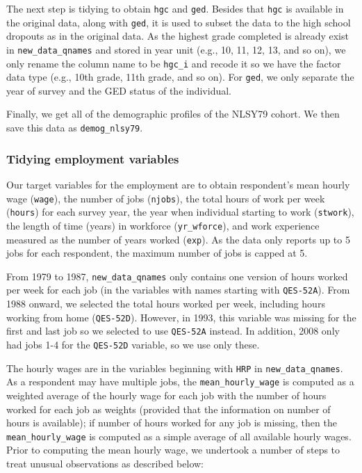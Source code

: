 \documentclass{article}
\begin{document}
The next step is tidying to obtain \texttt{hgc} and \texttt{ged}. Besides that \texttt{hgc} is available in the original data, along with \texttt{ged}, it is used to subset the data to the high school dropouts as in the original data. As the highest grade completed is already exist in \texttt{new\_data\_qnames} and stored in year unit (e.g., 10, 11, 12, 13, and so on), we only rename the column name to be \texttt{hgc\_i} and recode it so we have the factor data type (e.g., 10th grade, 11th grade, and so on). For \texttt{ged}, we only separate the year of survey and the GED status of the individual.

Finally, we get all of the demographic profiles of the NLSY79 cohort. We then save this data as \texttt{demog\_nlsy79}.

\hypertarget{tidyemp}{%
\subsubsection{Tidying employment variables}\label{tidyemp}}

Our target variables for the employment are to obtain respondent's mean hourly wage (\texttt{wage}), the number of jobs (\texttt{njobs}), the total hours of work per week (\texttt{hours}) for each survey year, the year when individual starting to work (\texttt{stwork}), the length of time (years) in workforce (\texttt{yr\_wforce}), and work experience measured as the number of years worked (\texttt{exp}). As the data only reports up to 5 jobs for each respondent, the maximum number of jobs is capped at 5.

From 1979 to 1987, \texttt{new\_data\_qnames} only contains one version of hours worked per week for each job (in the variables with names starting with \texttt{QES-52A}). From 1988 onward, we selected the total hours worked per week, including hours working from home (\texttt{QES-52D}). However, in 1993, this variable was missing for the first and last job so we selected to use \texttt{QES-52A} instead. In addition, 2008 only had jobs 1-4 for the \texttt{QES-52D} variable, so we use only these.

The hourly wages are in the variables beginning with \texttt{HRP} in \texttt{new\_data\_qnames}. As a respondent may have multiple jobs, the \texttt{mean\_hourly\_wage} is computed as a weighted average of the hourly wage for each job with the number of hours worked for each job as weights (provided that the information on number of hours is available); if number of hours worked for any job is missing, then the \texttt{mean\_hourly\_wage} is computed as a simple average of all available hourly wages. Prior to computing the mean hourly wage, we undertook a number of steps to treat unusual observations as described below:
\end{document}
